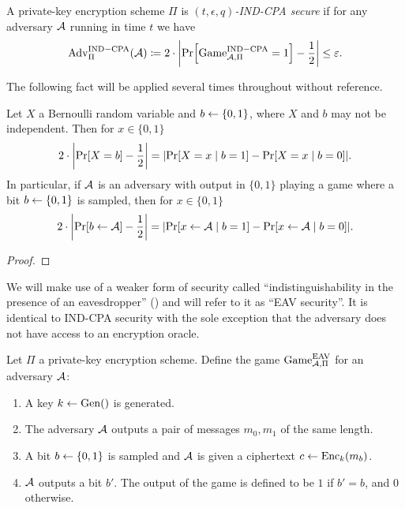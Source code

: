 \begin{definition}
	A private-key encryption scheme $\Pi$ is \emph{$(t, \epsilon, q)$-IND-CPA secure} if for any adversary $\mathcal{A}$ running in time $t$ we have
	\begin{align*}
		\mathrm{Adv}_{\Pi}^{\mathrm{IND-CPA}}(\adv) \coloneqq 2 \cdot \abs*{\pr{\mathrm{Game}_{\adv, \Pi}^{\mathrm{IND-CPA}} = 1} - \frac{1}{2}} \le \epsilon.
	\end{align*}
\end{definition}

The following fact will be applied several times throughout without reference.

\begin{lemma}
	Let $X$ a Bernoulli random variable and $b \leftarrow \{0, 1\}$, where $X$ and $b$ may not be independent. Then for $x \in \{0, 1\}$
	\[
		2 \cdot \abs*{\pr{X = b} - \frac{1}{2}} = \abs*{\pr{X = x \mid b = 1} - \pr{X = x \mid b = 0}}.
	\]
	In particular, if $\mathcal{A}$ is an adversary with output in $\{0, 1\}$ playing a game where a bit $b \leftarrow \{0, 1\}$ is sampled, then for $x \in \{0, 1\}$
	\[
		2 \cdot \abs*{\pr{b \from \adv} - \frac{1}{2}} = \abs*{\pr{x \from \adv \mid b = 1} - \pr{x \from \adv \mid b = 0}}.
	\]
\end{lemma}
\begin{proof}
\end{proof}


We will make use of a weaker form of security called ``indistinguishability in the presence of an eavesdropper'' (\cite{introduction-to-modern-cryptography}) and will refer to it as ``EAV security''. It is identical to IND-CPA security with the sole exception that the adversary does not have access to an encryption oracle.

\begin{definition}
	Let $\Pi$ a private-key encryption scheme. Define the game $\mathrm{Game}_{\mathcal{A}, \Pi}^{\mathrm{EAV}}$ for an adversary $\mathcal{A}$:
	\begin{enumerate}[1.]
		\item A key $k \leftarrow \mathrm{Gen}()$ is generated.
		\item The adversary $\mathcal{A}$ outputs a pair of messages $m_0, m_1$ of the same length.
		\item A bit $b \leftarrow \{0, 1\}$ is sampled and $\mathcal{A}$ is given a ciphertext $c \leftarrow \mathrm{Enc}_k(m_b)$.
		\item $\mathcal{A}$ outputs a bit $b'$. The output of the game is defined to be $1$ if $b' = b$, and $0$ otherwise.
	\end{enumerate}
\end{definition}

